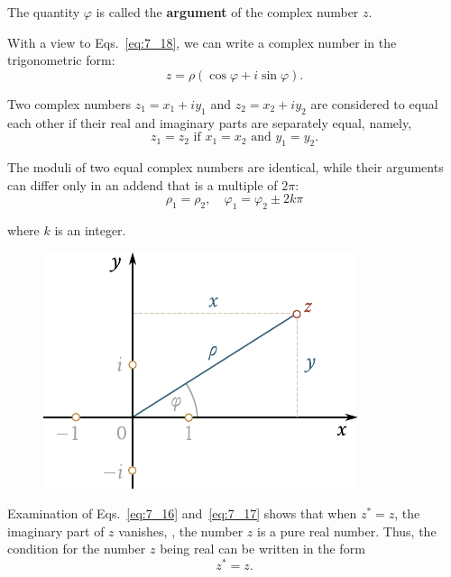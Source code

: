 \noindent
The quantity $\varphi$ is called the \textbf{argument} of the complex number $z$.

With a view to Eqs.~\eqref{eq:7_18}, we can write a complex number in the trigonometric form:
\begin{equation}\label{eq:7_20}
	z = \rho(\cos\varphi + i\sin\varphi).
\end{equation}

Two complex numbers $z_1=x_1+iy_1$ and $z_2=x_2+iy_2$ are considered to equal each other if their real and imaginary parts are separately equal, namely,
\begin{equation}\label{eq:7_21}
	z_1 = z_2\,\, \text{if}\,\, x_1 = x_2\,\, \text{and}\,\, y_1 = y_2.
\end{equation}

\noindent
The moduli of two equal complex numbers are identical, while their arguments can differ only in an addend that is a multiple of $2\pi$:
\begin{equation}\label{eq:7_22}
	\rho_1 = \rho_2,\quad \varphi_1 = \varphi_2\pm 2k\pi
\end{equation}

\noindent
where $k$ is an integer.

\begin{figure}[t]
	\begin{center}
		\includegraphics[scale=0.95]{figures/ch_07/fig_7_3.pdf}
		\caption[]{}
		\label{fig:7_3}
	\end{center}
	\vspace{-0.7cm}
\end{figure}

Examination of Eqs.~\eqref{eq:7_16} and~\eqref{eq:7_17} shows that when $z^*=z$, the imaginary part of $z$ vanishes, \ie, the number $z$ is a pure real number. Thus, the condition for the number $z$ being real can be written in the form
\begin{equation}\label{eq:7_23}
	z^* = z.
\end{equation}

